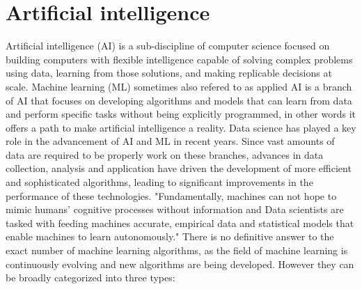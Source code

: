 \documentclass{vgtc}                          %
\begin{document}
\section{Artificial intelligence}

Artificial intelligence (AI) is a sub-discipline of computer science focused on building computers with flexible intelligence capable of solving complex problems using data, learning from those 
solutions, and making replicable decisions at scale. Machine learning (ML) sometimes also refered to as applied AI is a branch of AI that focuses on developing algorithms and models that can 
learn from data and perform specific tasks without being explicitly programmed, in other words it offers a path to make artificial intelligence a reality. Data science has played a key role in the 
advancement of AI and ML in recent years. Since vast amounts of data are required to be properly work on these branches, advances in data collection, analysis and application have driven the development 
of more efficient and sophisticated algorithms, leading to significant improvements in the performance of these technologies. "Fundamentally, machines can not hope to mimic humans' cognitive processes 
without information and Data scientists are tasked with feeding machines accurate, empirical data and statistical models that enable machines to learn autonomously."\cite{Rice:2023} There is no 
definitive answer to the exact number of machine learning algorithms, as the field of machine learning is continuously evolving and new algorithms are being developed. However they can be 
broadly categorized into three types:
\end{document}
